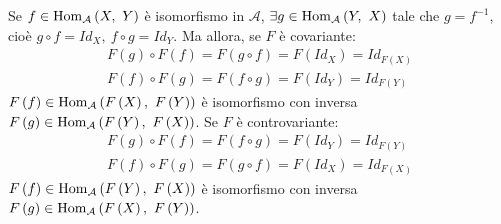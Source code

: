 \begin{demonstration}
	Se $f\in \mathrm{Hom}_{\mathcal{A}}\left(X,\ Y\right)$ è isomorfismo in $\mathcal{A}$, $\exists g\in\mathrm{Hom}_{\mathcal{A}}\left(Y,\ X\right)$ tale che $g=f^{-1}$, cioè $g\circ f=Id_X,\ f\circ g=Id_Y$. Ma allora, se $F$ è covariante:
	\begin{gather*}
		F\left(g\right)\circ F\left(f\right)=F\left(g\circ f\right)=F\left(Id_X\right)=Id_{F\left(X\right)}\\
		F\left(f\right)\circ F\left(g\right)=F\left(f\circ g\right)=F\left(Id_Y\right)=Id_{F\left(Y\right)}
	\end{gather*}
$F\left(f\right)\in\mathrm{Hom}_{\mathcal{A}}\left(F\left(X\right),\ F\left(Y\right)\right)$ è isomorfismo con inversa $F\left(g\right)\in\mathrm{Hom}_{\mathcal{A}}\left(F\left(Y\right),\ F\left(X\right)\right)$. Se $F$ è controvariante:
\begin{gather*}
	F\left(g\right)\circ F\left(f\right)=F\left(f\circ g\right)=F\left(Id_Y\right)=Id_{F\left(Y\right)}\\
	F\left(f\right)\circ F\left(g\right)=F\left(g\circ f\right)=F\left(Id_X\right)=Id_{F\left(X\right)}
\end{gather*}
$F\left(f\right)\in\mathrm{Hom}_{\mathcal{A}}\left(F\left(Y\right),\ F\left(X\right)\right)$ è isomorfismo con inversa $F\left(g\right)\in\mathrm{Hom}_{\mathcal{A}}\left(F\left(X\right),\ F\left(Y\right)\right)$.
\end{demonstration}

